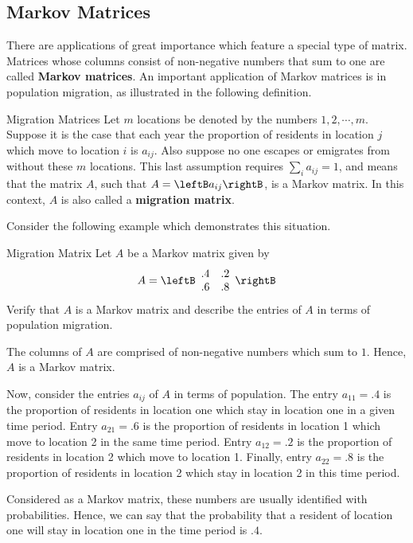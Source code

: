 \subsection{Markov Matrices}

There are applications of great importance which feature a special type of matrix.  Matrices whose columns consist of non-negative numbers that sum to one are
 called \textbf{Markov matrices}. An important application of Markov matrices is
in population migration, as illustrated in the following definition. 

\begin{definition}{Migration Matrices}\label{def:migrationmatrix}
Let $m$ locations be denoted by the numbers $1,2,\cdots ,m.$ Suppose
it is the case that each year the proportion of residents in location
$j$ which move to location $i$ is $a_{ij}$. Also suppose no one
escapes or emigrates from without these $m$ locations. This last
assumption requires $\sum_{i}a_{ij}=1$, and means that the matrix $A$,
such that $A = \leftB a_{ij} \rightB$, is a Markov matrix. In this context,
$A$ is also called a \textbf{migration matrix}.
\end{definition}

Consider the following example which demonstrates this situation.

\begin{example}{Migration Matrix}\label{exa:migrationmatrix}
Let $A$ be a Markov matrix given by 
\begin{equation*}
A = 
\leftB
\begin{array}{rr}
.4 & .2 \\
.6 & .8
\end{array}
\rightB
\end{equation*}
Verify that $A$ is a Markov matrix and describe the entries of $A$ in terms of population migration.
\end{example}

\begin{solution}
The columns of $A$ are comprised of non-negative numbers which sum to $1$. Hence, $A$ is a Markov matrix. 

Now, consider the entries $a_{ij}$ of $A$ in terms of population. The
entry $a_{11} = .4$ is the proportion of residents in location one
which stay in location one in a given time period.  Entry $a_{21} =
.6$ is the proportion of residents in location 1 which move to
location 2 in the same time period. Entry $a_{12} = .2$ is the
proportion of residents in location 2 which move to location
1. Finally, entry $a_{22} = .8$ is the proportion of residents in
location 2 which stay in location 2 in this time period.  

Considered as a Markov matrix, these numbers are usually identified
with probabilities. Hence, we can say that the probability that a
resident of location one will stay in location one in the time period
is $.4$.
\end{solution}


